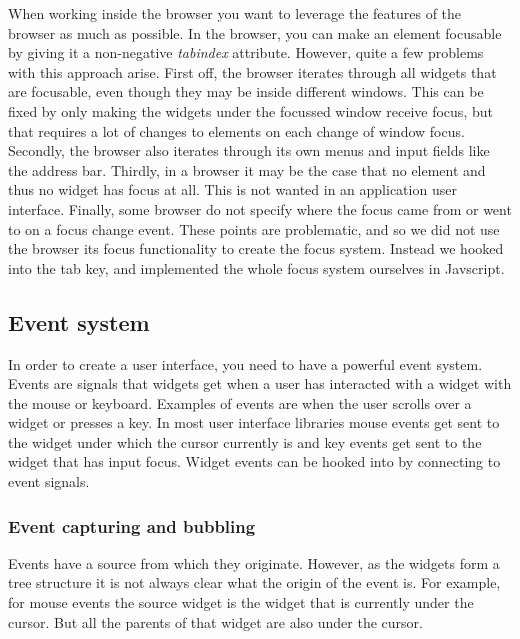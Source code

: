\documentclass[11pt,a4paper]{article}
\begin{document}
When working inside the browser you want to leverage the features of the browser as much as possible.
In the browser, you can make an element focusable by giving it a non-negative \textit{tabindex} attribute.
However, quite a few problems with this approach arise.
First off, the browser iterates through all widgets that are focusable, even though they may be inside different windows.
This can be fixed by only making the widgets under the focussed window receive focus, but that requires a lot of changes to elements on each change of window focus.
Secondly, the browser also iterates through its own menus and input fields like the address bar.
Thirdly, in a browser it may be the case that no element and thus no widget has focus at all.
This is not wanted in an application user interface.
Finally, some browser do not specify where the focus came from or went to on a focus change event.
These points are problematic, and so we did not use the browser its focus functionality to create the focus system.
Instead we hooked into the tab key, and implemented the whole focus system ourselves in Javscript.

\subsection{Event system}

In order to create a user interface, you need to have a powerful event system.
Events are signals that widgets get when a user has interacted with a widget with the mouse or keyboard.
Examples of events are when the user scrolls over a widget or presses a key.
In most user interface libraries mouse events get sent to the widget under which the cursor currently is and key events get sent to the widget that has input focus.
Widget events can be hooked into by connecting to event signals.

\subsubsection{Event capturing and bubbling}

Events have a source from which they originate.
However, as the widgets form a tree structure it is not always clear what the origin of the event is.
For example, for mouse events the source widget is the widget that is currently under the cursor.
But all the parents of that widget are also under the cursor.
\end{document}
